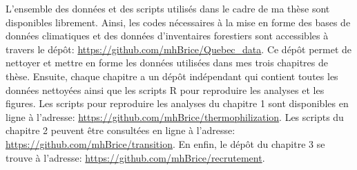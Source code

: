 L'ensemble des données et des scripts utilisés dans le cadre de ma thèse
sont disponibles librement. Ainsi, les codes nécessaires à la mise en
forme des bases de données climatiques et des données d'inventaires
forestiers sont accessibles à travers le dépôt:
\url{https://github.com/mhBrice/Quebec_data}. Ce dépôt permet de
nettoyer et mettre en forme les données utilisées dans mes trois
chapitres de thèse. Ensuite, chaque chapitre a un dépôt indépendant qui
contient toutes les données nettoyées ainsi que les scripts R pour
reproduire les analyses et les figures. Les scripts pour reproduire les
analyses du chapitre 1 sont disponibles en ligne à l'adresse:
\url{https://github.com/mhBrice/thermophilization}. Les scripts du
chapitre 2 peuvent être consultées en ligne à l'adresse:
\url{https://github.com/mhBrice/transition}. En enfin, le dépôt du
chapitre 3 se trouve à l'adresse:
\url{https://github.com/mhBrice/recrutement}.
